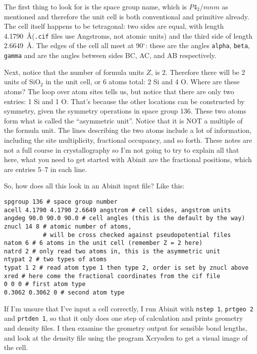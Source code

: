 \documentclass{article}
\begin{document}
The first thing to look for is the space group name, which is $P4_2/mnm$ as mentioned and therefore the unit cell
is both conventional and primitive already. The cell itself happens to be tetragonal: two sides are equal, 
with length 4.1790~\AA ({\tt .cif} files use Angstroms, not atomic units) and the third side of length 2.6649~\AA.
The edges of the cell all meet at 90$^\circ$: these are the angles {\tt alpha}, {\tt beta}, {\tt gamma} and 
are the angles between sides BC, AC, and AB respectively.

Next, notice that the number of formula units $Z$, is 2. Therefore there will be 2 units of SiO$_2$ in the unit cell,
or 6 atoms total: 2 Si and 4 O. Where are these atoms? The loop over atom sites tells us, but notice that
there are only two entries: 1 Si and 1 O. That's because the other locations can be constructed by symmetry, given 
the symmetry operations in space group 136. These two atoms form what is called the ``asymmetric unit''. Notice
that it is NOT a multiple of the formula unit. The lines describing the two atoms include a lot of information,
including the site multiplicity, fractional occupancy, and so forth. These notes are not a full course in
crystallography so I'm not going to try to explain all that here, what you need to get started with {\sc Abinit}
are the fractional positions, which are entries 5--7 in  each line.

So, how does all this look in an {\sc Abinit} input file? Like this:
\begin{verbatim}
spgroup 136 # space group number
acell 4.1790 4.1790 2.6649 angstrom # cell sides, angstrom units
angdeg 90.0 90.0 90.0 # cell angles (this is the default by the way)
znucl 14 8 # atomic number of atoms, 
           # will be cross checked against pseudopotential files
natom 6 # 6 atoms in the unit cell (remember Z = 2 here)
natrd 2 # only read two atoms in, this is the asymmetric unit
ntypat 2 # two types of atoms
typat 1 2 # read atom type 1 then type 2, order is set by znucl above
xred # here come the fractional coordinates from the cif file
0 0 0 # first atom type
0.3062 0.3062 0 # second atom type
\end{verbatim}

If I'm unsure that I've input a cell correctly, I run {\sc Abinit} with {\tt nstep 1}, {\tt prtgeo 2} and
{\tt prtden 1}, so that
it only does one step of calculation and prints  geometry and density files. I then examine the 
geometry output for sensible bond lengths, and look at the density file using the program {\sc Xcrysden}
to get a visual image of the cell.
\end{document}
